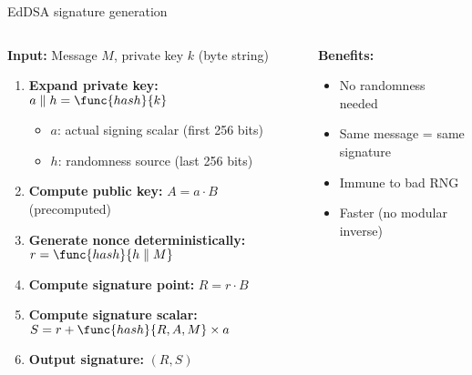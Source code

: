 \documentclass[aspectratio=169, lualatex, handout]{beamer}
\begin{document}
\begin{frame}{EdDSA signature generation}
	\begin{columns}
		\begin{column}{0.7\textwidth}
			\textbf{Input:} Message $M$, private key $k$ (byte string)
			\begin{enumerate}
				\item \textbf{Expand private key:} $a \parallel h = \func{hash}{k}$
				      \begin{itemize}
					      \item $a$: actual signing scalar (first 256 bits)
					      \item $h$: randomness source (last 256 bits)
				      \end{itemize}
				\item \textbf{Compute public key:} $A = a \cdot B$ (precomputed)
				\item \textbf{Generate nonce deterministically:} $r = \func{hash}{h \parallel M}$
				\item \textbf{Compute signature point:} $R = r \cdot B$
				\item \textbf{Compute signature scalar:} $S = r + \func{hash}{R, A, M} \times a$
				\item \textbf{Output signature:} $(R, S)$
			\end{enumerate}
		\end{column}
		\begin{column}{0.3\textwidth}
			\textbf{Benefits:}
			\begin{itemize}
				\item No randomness needed
				\item Same message = same signature
				\item Immune to bad RNG
				\item Faster (no modular inverse)
			\end{itemize}
		\end{column}
	\end{columns}
\end{frame}
\end{document}
